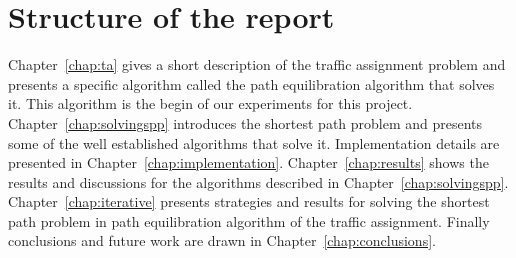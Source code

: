 \section{Structure of the report}
Chapter~\ref{chap:ta} gives a short description of the traffic assignment problem
and presents a specific algorithm called the path equilibration algorithm that solves it.
This algorithm is the begin of our experiments for this project.
Chapter~\ref{chap:solvingspp} introduces the shortest path problem and presents some of the well established algorithms that solve it.
Implementation details are presented in Chapter~\ref{chap:implementation}.
Chapter~\ref{chap:results} shows the results and discussions for the algorithms described in Chapter~\ref{chap:solvingspp}.
Chapter~\ref{chap:iterative} presents strategies and results for solving the shortest path problem in path equilibration algorithm of the traffic assignment.
Finally conclusions and future work are drawn in Chapter~\ref{chap:conclusions}.
